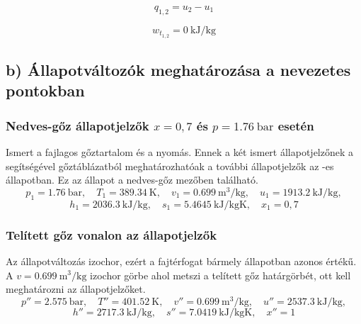 \begin{equation}
	q_{1,2}=u_2-u_1%
\end{equation}

\begin{equation}
	w_{t_{1,2}}=\SI{0}{\kilo\joule\per\kilogram}	
\end{equation}

\subsection*{b) Állapotváltozók meghatározása a nevezetes pontokban}
\subsubsection{Nedves-gőz állapotjelzők $x = 0,7$ és $p = \SI{1,76}{\bar}$ esetén}
Ismert a fajlagos gőztartalom és a nyomás. Ennek a két ismert állapotjelzőnek a segítségével gőztáblázatból meghatározhatóak a további állapotjelzők az \raisebox{.5pt}{\textcircled{\raisebox{-.9pt} {1}}}-es állapotban. Ez az állapot a nedves-gőz mezőben található.
\begin{equation}
	p_1=\SI{1,76}{\bar},
	\quad
	T_1=\SI{389,34}{\kelvin},
	\quad
	v_1=\SI{0,699}{\meter\cubed\per\kilogram},
	\quad
	u_1=\SI{1913,2}{\kilo\joule\per\kilogram},
\end{equation}
\begin{equation}
	h_1=\SI{2036,3}{\kilo\joule\per\kilogram},
	\quad
	s_1=\SI{5,4645}{\kilo\joule\per\kilogram\kelvin},
	\quad
	x_1=0,7
\end{equation}

\subsubsection{Telített gőz vonalon az állapotjelzők}
Az állapotváltozás izochor, ezért a fajtérfogat bármely állapotban azonos értékű. A $v=\SI{0,699}{\meter\cubed\per\kilo\gram}$ izochor görbe ahol metszi a telített gőz határgörbét, ott kell meghatározni az állapotjelzőket.
\begin{equation}
	p''=\SI{2,575}{\bar},
	\quad
	T''=\SI{401,52}{\kelvin},
	\quad
	v''=\SI{0,699}{\meter\cubed\per\kilogram},
	\quad
	u''=\SI{2537,3}{\kilo\joule\per\kilogram},
\end{equation}
\begin{equation}
	h''=\SI{2717,3}{\kilo\joule\per\kilogram},
	\quad
	s''=\SI{7,0419}{\kilo\joule\per\kilogram\kelvin},
	\quad
	x''=1
\end{equation}

